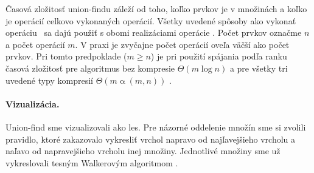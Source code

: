 \bigskip
Časová zložitosť union-findu záleží od toho, koľko prvkov je v množinách a koľko je 
operácií celkovo vykonaných operácií. Všetky uvedené spôsoby ako vykonať 
operáciu \find\ sa dajú použiť s obomi realizáciami operácie \union. 
Počet prvkov označme $n$ a počet operácií $m$. V praxi je zvyčajne počet 
operácií oveľa väčší ako počet prvkov. Pri tomto predpoklade ($m\geq n$) je 
pri použití spájania podľa ranku časová zložitosť pre algoritmus bez kompresie 
$\Theta(m\log n)$ a pre všetky tri uvedené typy kompresií 
$\Theta(m\mathop{\alpha}(m,n))$ \citep{paths2}.

\paragraph{Vizualizácia.} Union-find sme vizualizovali ako les. Pre názorné 
oddelenie množín sme si zvolili pravidlo, ktoré zakazovalo vykresliť vrchol 
napravo od najľavejšieho vrcholu a naľavo od napravejšieho vrcholu inej 
množiny. Jednotlivé množiny sme už vykreslovali tesným Walkerovým algoritmom 
\citep{walker}. 





